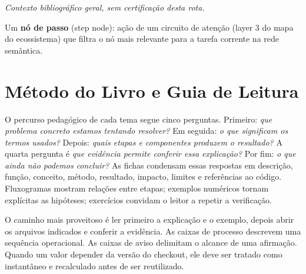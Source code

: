 \noindent\textit{Contexto bibliográfico geral, sem certificação desta rota.} 


\begin{definicao}
Um \textbf{nó de passo} (step node): ação de um circuito de atenção (layer 3 do
mapa do ecossistema) que filtra o nó mais relevante para a tarefa corrente na rede
semântica.
\end{definicao}

\clearpage
\section{Método do Livro e Guia de Leitura}


\begin{metodo}
O percurso pedagógico de cada tema segue cinco perguntas. Primeiro: \emph{que
problema concreto estamos tentando resolver?} Em seguida: \emph{o que significam
os termos usados?} Depois: \emph{quais etapas e componentes produzem o resultado?}
A quarta pergunta é \emph{que evidência permite conferir essa explicação?} Por
fim: \emph{o que ainda não podemos concluir?} As fichas condensam essas respostas
em descrição, função, conceito, método, resultado, impacto, limites e referências
ao código. Fluxogramas mostram relações entre etapas; exemplos numéricos tornam
explícitas as hipóteses; exercícios convidam o leitor a repetir a verificação.

O caminho mais proveitoso é ler primeiro a explicação e o exemplo, depois abrir os
arquivos indicados e conferir a evidência. As caixas de processo descrevem uma
sequência operacional. As caixas de aviso delimitam o alcance de uma afirmação.
Quando um valor depender da versão do checkout, ele deve ser tratado como
instantâneo e recalculado antes de ser reutilizado.
\end{metodo}

